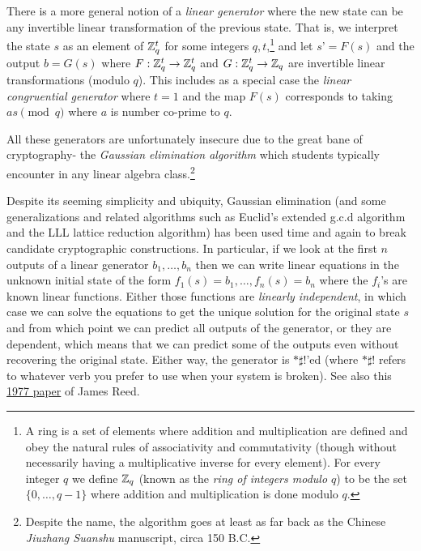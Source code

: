 There is a more general notion of a \emph{linear generator} where the
new state can be any invertible linear transformation of the previous
state. That is, we interpret the state \(s\) as an element of \({\mathbb{Z}}_q^t\)
for some integers \(q,t\),\footnote{A ring is a set of elements where
  addition and multiplication are defined and obey the natural rules of
  associativity and commutativity (though without necessarily having a
  multiplicative inverse for every element). For every integer \(q\) we
  define \({\mathbb{Z}}_q\) (known as the \emph{ring of integers modulo \(q\)}) to
  be the set \(\{0,\ldots,q-1\}\) where addition and multiplication is
  done modulo \(q\).} and let \(s’=F(s)\) and the output \(b=G(s)\)
where \(F:{\mathbb{Z}}_q^t\rightarrow{\mathbb{Z}}_q^t\) and \(G:{\mathbb{Z}}_q^t\rightarrow{\mathbb{Z}}_q\) are
invertible linear transformations (modulo \(q\)). This includes as a
special case the \emph{linear congruential generator} where \(t=1\) and
the map \(F(s)\) corresponds to taking \(as \pmod{q}\) where \(a\) is
number co-prime to \(q\).

All these generators are unfortunately insecure due to the great bane of
cryptography- the \emph{Gaussian elimination algorithm} which students
typically encounter in any linear algebra class.\footnote{Despite the
  name, the algorithm goes at least as far back as the Chinese
  \emph{Jiuzhang Suanshu} manuscript, circa 150 B.C.}

\hypertarget{gaussianelimthm}{}

Despite its seeming simplicity and ubiquity, Gaussian elimination (and
some generalizations and related algorithms such as Euclid's extended
g.c.d algorithm and the LLL lattice reduction algorithm) has been used
time and again to break candidate cryptographic constructions. In
particular, if we look at the first \(n\) outputs of a linear generator
\(b_1,\ldots,b_n\) then we can write linear equations in the unknown
initial state of the form \(f_1(s)=b_1,\ldots,f_n(s)=b_n\) where the
\(f_i\)'s are known linear functions. Either those functions are
\emph{linearly independent}, in which case we can solve the equations to
get the unique solution for the original state \(s\) and from which
point we can predict all outputs of the generator, or they are
dependent, which means that we can predict some of the outputs even
without recovering the original state. Either way, the generator is
\(*\sharp !\)'ed (where \(* \sharp !\) refers to whatever verb you
prefer to use when your system is broken). See also this
\href{http://alumni.cs.ucr.edu/~jsun/random-number.pdf}{1977 paper} of
James Reed.

